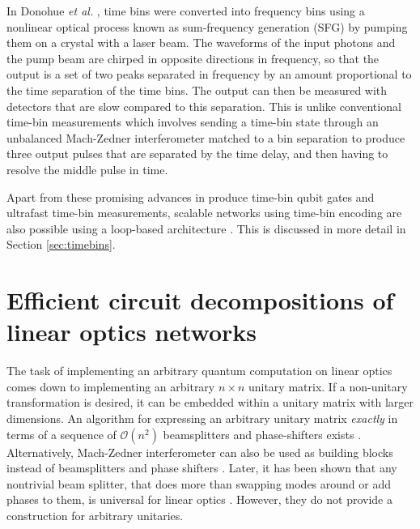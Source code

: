 \documentclass[aps,rmp,twocolumn,amsmath,amssymb,nofootinbib,superscriptaddress]{revtex4}
\begin{document}
In Donohue {\it et al.} \cite{bib:Donohue2013}, time bins were converted into frequency bins using a nonlinear optical process known as sum-frequency generation (SFG) by pumping them on a crystal with a laser beam. The waveforms of the input photons and the pump beam are chirped in opposite directions in frequency, so that the output is a set of two peaks separated in frequency by an amount proportional to the time separation of the time bins. The output can then be measured with detectors that are slow compared to this separation. This is unlike conventional time-bin measurements which involves sending a time-bin state through an unbalanced Mach-Zedner interferometer matched to a bin separation to produce three output pulses that are separated by the time delay, and then having to resolve the middle pulse in time. 

Apart from these promising advances in produce time-bin qubit gates and ultrafast time-bin measurements, scalable networks using time-bin encoding are also possible using a loop-based architecture \cite{bib:Motes14}. This is discussed in more detail in Section \ref{sec:timebins}.




\section{Efficient circuit decompositions of linear optics networks}

The task of implementing an arbitrary quantum computation on linear optics comes down to implementing an arbitrary $n\times n$ unitary matrix. If a non-unitary transformation is desired, it can be embedded within a unitary matrix with larger dimensions. An algorithm for expressing an arbitrary unitary matrix {\it exactly} in terms of a sequence of $\mathcal{O}(n^2)$ beamsplitters and phase-shifters exists \cite{bib:Reck1994}. Alternatively, Mach-Zedner interferometer can also be used as building blocks instead of beamsplitters and phase shifters \cite{bib:Reck1994, bib:Englert2001}. Later, it has been shown that any nontrivial beam splitter, that does more than swapping modes around or add phases to them, is universal for linear optics \cite{bib:Bouland2014}. However, they do not provide a construction for arbitrary unitaries.
\end{document}
